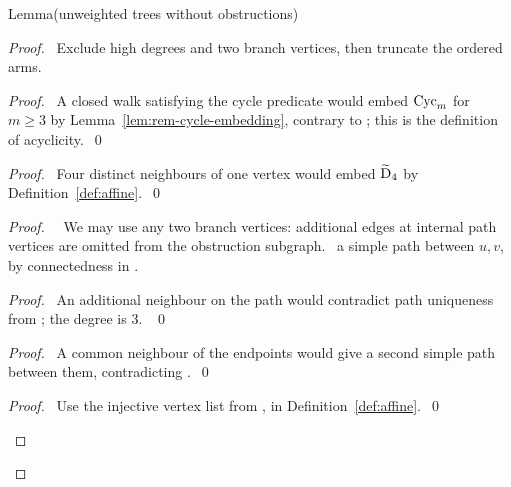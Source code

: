 \begin{namedresult}{Lemma}{(unweighted trees without obstructions)}\label{lem:unweighted-trees}
\end{namedresult}
\begin{proof}
\pfsketch\ Exclude high degrees and two branch vertices, then truncate
the ordered arms.
\begin{proof}\pf\ A closed walk satisfying the cycle predicate would
embed $\operatorname{Cyc}_m$ for $m\geq3$ by Lemma~\ref{lem:rem-cycle-embedding},
contrary to ; this is the definition of acyclicity.~\qed\end{proof}
\begin{proof}\pf\ Four distinct neighbours of one vertex would embed
$\widetilde{\mathrm{D}}_4$ by Definition~\ref{def:affine}.~\qed\end{proof}
\begin{proof}
\pfsketch\ \new\ We may use any two branch vertices: additional edges
at internal path vertices are omitted from the obstruction subgraph.
\pick\ a simple path between $u,v$, by connectedness in .
\begin{proof}\pf\ An additional neighbour on the path would contradict
path uniqueness from ; the degree is 3. ~\qed\end{proof}
\begin{proof}\pf\ A common neighbour of the endpoints would give a
second simple path between them, contradicting .~\qed\end{proof}
\begin{proof}\pf\ Use the injective vertex list from
,  in Definition~\ref{def:affine}.~\qed\end{proof}

\end{proof}
\end{proof}
